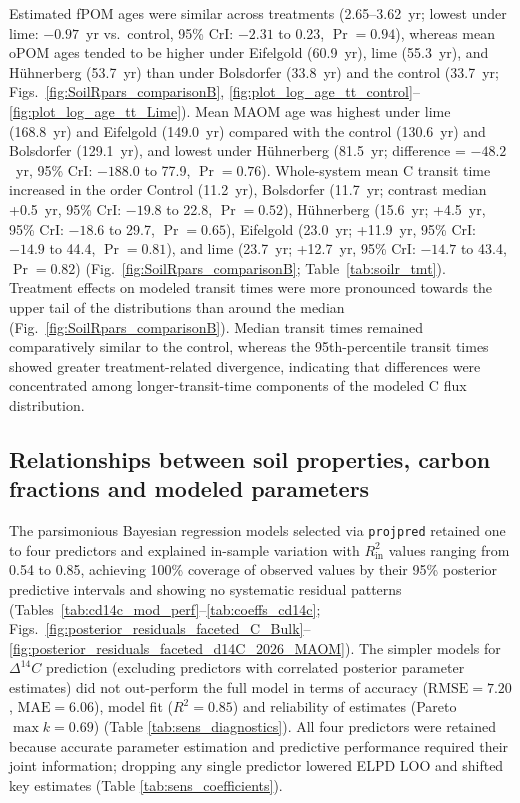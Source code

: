 \documentclass[preprint,12pt]{elsarticle}
\begin{document}
Estimated fPOM ages were similar across treatments (2.65--3.62~yr; lowest under lime: $-0.97$~yr vs.\ control, 95\% CrI: $-2.31$ to 0.23, $\Pr = 0.94$), whereas mean oPOM ages tended to be higher under Eifelgold (60.9~yr), lime (55.3~yr), and H\"uhnerberg (53.7~yr) than under Bolsdorfer (33.8~yr) and the control (33.7~yr; Figs.~\ref{fig:SoilRpars_comparisonB}, \ref{fig:plot_log_age_tt_control}--\ref{fig:plot_log_age_tt_Lime}). Mean MAOM age was highest under lime (168.8~yr) and Eifelgold (149.0~yr) compared with the control (130.6~yr) and Bolsdorfer (129.1~yr), and lowest under H\"uhnerberg (81.5~yr; difference = $-48.2$~yr, 95\% CrI: $-188.0$ to 77.9, $\Pr = 0.76$). Whole-system mean C transit time increased in the order Control (11.2~yr), Bolsdorfer (11.7~yr; contrast median +0.5~yr, 95\% CrI: $-19.8$ to 22.8, $\Pr = 0.52$), H\"uhnerberg (15.6~yr; +4.5~yr, 95\% CrI: $-18.6$ to 29.7, $\Pr = 0.65$), Eifelgold (23.0~yr; +11.9~yr, 95\% CrI: $-14.9$ to 44.4, $\Pr = 0.81$), and lime (23.7~yr; +12.7~yr, 95\% CrI: $-14.7$ to 43.4, $\Pr = 0.82$) (Fig.~\ref{fig:SoilRpars_comparisonB}; Table~\ref{tab:soilr_tmt}). Treatment effects on modeled transit times were more pronounced towards the upper tail of the distributions than around the median (Fig.~\ref{fig:SoilRpars_comparisonB}). Median transit times remained comparatively similar to the control, whereas the 95th-percentile transit times showed greater treatment-related divergence, indicating that differences were concentrated among longer-transit-time components of the modeled C flux distribution.

\subsection{Relationships between soil properties, carbon fractions and modeled parameters}
\label{subsec:carbon_fractions_models}

The parsimonious Bayesian regression models selected via \texttt{projpred} retained one to four predictors and explained in-sample variation with $R^2_{\mathrm{in}}$ values ranging from 0.54 to 0.85, achieving 100\% coverage of observed values by their 95\% posterior predictive intervals and showing no systematic residual patterns (Tables~\ref{tab:cd14c_mod_perf}--\ref{tab:coeffs_cd14c}; Figs.~\ref{fig:posterior_residuals_faceted_C_Bulk}--\ref{fig:posterior_residuals_faceted_d14C_2026_MAOM}). The simpler models for $\Delta^{14}C$ prediction (excluding predictors with correlated posterior parameter estimates) did not out-perform the full model in terms of accuracy ($\text{RMSE} = 7.20$, $\text{MAE} = 6.06$), model fit ($R^2 = 0.85$) and reliability of estimates (Pareto $\max k = 0.69$) (Table \ref{tab:sens_diagnostics}). All four predictors were retained because accurate parameter estimation and predictive performance required their joint information; dropping any single predictor lowered ELPD LOO and shifted key estimates (Table \ref{tab:sens_coefficients}).
\end{document}
